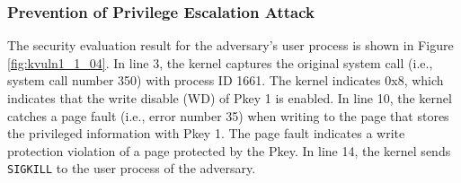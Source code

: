 \subsubsection{Prevention of Privilege Escalation Attack}
The security evaluation result for the adversary's user process is shown in
Figure \ref{fig:kvuln1_1_04}.
In line 3, the kernel captures the original system call (i.e., system call
number 350) with process ID 1661. The kernel indicates 0x8, which indicates that
the write disable (WD) of Pkey 1 is enabled.
In line 10, the kernel catches a page fault (i.e., error number 35) when writing
to the page that stores the privileged information with Pkey 1. The page fault
indicates a write protection violation of a page protected by the Pkey. In line
14, the kernel sends \verb|SIGKILL| to the user process of the adversary.

%




